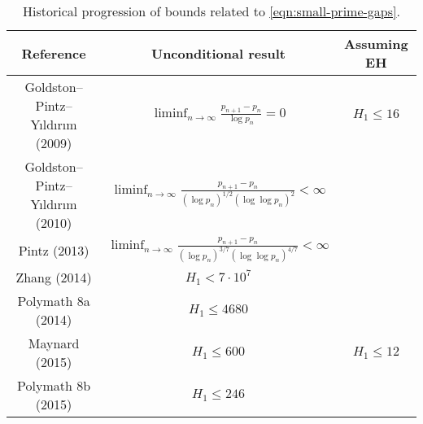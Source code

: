 \begin{table}[ht]
    \caption{Historical progression of bounds related to \eqref{eqn:small-prime-gaps}.}
    \centering
    \renewcommand{\arraystretch}{2.2}
    \begin{tabular}{|c|c|c|}
    \hline
    Reference & Unconditional result & Assuming EH \\
    \hline
    Goldston--Pintz--Yıldırım (2009) \cite{goldston_primes_2009} & $\displaystyle\liminf_{n\to\infty}\frac{p_{n + 1} - p_n}{\log p_n} = 0$ & $H_1 \le 16$ \\
    \hline
    Goldston--Pintz--Yıldırım (2010) \cite{goldston_primes_2010} & $\displaystyle\liminf_{n\to\infty}\frac{p_{n + 1} - p_n}{(\log p_n)^{1/2}(\log\log p_n)^2} < \infty$ & \\
    \hline
    Pintz (2013) \cite{} & $\displaystyle\liminf_{n\to\infty}\frac{p_{n + 1} - p_n}{(\log p_n)^{3/7}(\log\log p_n)^{4/7}} < \infty$ & \\
    \hline
    Zhang (2014) \cite{zhang_bounded_2014} & $H_1 < 7\cdot 10^7$ & \\
    \hline
    Polymath 8a (2014) \cite{castryck_new_2014} & $H_1 \le 4680$ & \\
    \hline
    Maynard (2015) \cite{maynard_small_2015} & $H_1 \le 600$ & $H_1 \le 12$ \\
    \hline
    Polymath 8b (2015) \cite{polymath_variants_2014} & $H_1 \le 246$ & \\
    \hline
    \end{tabular}
\end{table}\label{small-primegap-table}

